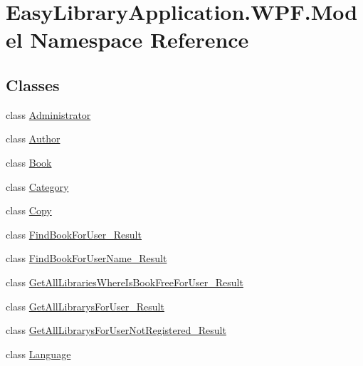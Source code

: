 \hypertarget{namespace_easy_library_application_1_1_w_p_f_1_1_model}{}\section{Easy\+Library\+Application.\+W\+P\+F.\+Model Namespace Reference}
\label{namespace_easy_library_application_1_1_w_p_f_1_1_model}
\subsection*{Classes}
\begin{DoxyCompactItemize}
\item 
class \mbox{\hyperlink{class_easy_library_application_1_1_w_p_f_1_1_model_1_1_administrator}{Administrator}}
\item 
class \mbox{\hyperlink{class_easy_library_application_1_1_w_p_f_1_1_model_1_1_author}{Author}}
\item 
class \mbox{\hyperlink{class_easy_library_application_1_1_w_p_f_1_1_model_1_1_book}{Book}}
\item 
class \mbox{\hyperlink{class_easy_library_application_1_1_w_p_f_1_1_model_1_1_category}{Category}}
\item 
class \mbox{\hyperlink{class_easy_library_application_1_1_w_p_f_1_1_model_1_1_copy}{Copy}}
\item 
class \mbox{\hyperlink{class_easy_library_application_1_1_w_p_f_1_1_model_1_1_find_book_for_user___result}{Find\+Book\+For\+User\+\_\+\+Result}}
\item 
class \mbox{\hyperlink{class_easy_library_application_1_1_w_p_f_1_1_model_1_1_find_book_for_user_name___result}{Find\+Book\+For\+User\+Name\+\_\+\+Result}}
\item 
class \mbox{\hyperlink{class_easy_library_application_1_1_w_p_f_1_1_model_1_1_get_all_libraries_where_is_book_free_for_user___result}{Get\+All\+Libraries\+Where\+Is\+Book\+Free\+For\+User\+\_\+\+Result}}
\item 
class \mbox{\hyperlink{class_easy_library_application_1_1_w_p_f_1_1_model_1_1_get_all_librarys_for_user___result}{Get\+All\+Librarys\+For\+User\+\_\+\+Result}}
\item 
class \mbox{\hyperlink{class_easy_library_application_1_1_w_p_f_1_1_model_1_1_get_all_librarys_for_user_not_registered___result}{Get\+All\+Librarys\+For\+User\+Not\+Registered\+\_\+\+Result}}
\item 
class \mbox{\hyperlink{class_easy_library_application_1_1_w_p_f_1_1_model_1_1_language}{Language}}

\end{DoxyCompactItemize}

